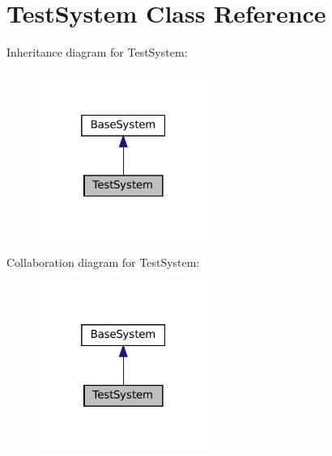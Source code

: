 \hypertarget{classTestSystem}{}\section{Test\+System Class Reference}
\label{classTestSystem}


Inheritance diagram for Test\+System\+:
\nopagebreak
\begin{figure}[H]
\begin{center}
\leavevmode
\includegraphics[width=157pt]{classTestSystem__inherit__graph}
\end{center}
\end{figure}


Collaboration diagram for Test\+System\+:
\nopagebreak
\begin{figure}[H]
\begin{center}
\leavevmode
\includegraphics[width=157pt]{classTestSystem__coll__graph}
\end{center}
\end{figure}
